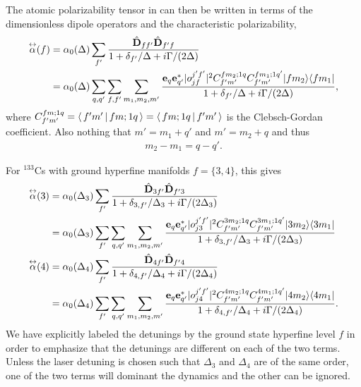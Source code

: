 The atomic polarizability tensor in  can then be written in terms of the dimensionless dipole operators and the characteristic polarizability,
\begin{align} \label{Eq::AtomicPolarizabilityF}
\tensor{\alpha}(f) &=  \alpha_0(\Delta) \sum_{f'} \frac{ \hat{\mathbf{D}}_{f f'} \hat{\mathbf{D}}_{f' f}}{ 1 + \delta_{f'} / \Delta + i \Gamma/(2\Delta)}\\
& = \alpha_0(\Delta) \sum_{q,q'}  \sum_{f,f'} \sum_{m_1, m_2, m'}  \frac{\mathbf{e}_q \mathbf{e}^*_{q'} | o^{j'f'}_{jf} |^2 C^{fm_2;1q}_{f'm'} C^{fm_1;1q'}_{f'm'} \op{f m_2}{f m_1}}{1 + \delta_{f'} / \Delta + i \Gamma/(2\Delta)},
\end{align}
where $ C^{fm;1q}_{f'm'}=  \langle\, f' m'\,\vert\, f m; 1 q \,\rangle= \langle\, f m; 1 q\,\vert\, f' m' \,\rangle$ is the Clebsch-Gordan coefficient. Also nothing that $m' = m_1 + q'$ and $m' = m_2 + q$ and thus
\begin{align}
	m_2 - m_1 = q-q'.
\end{align}

For ${}^{133}$Cs with ground hyperfine manifolds $f = \{3,4\}$, this gives
\begin{align}
\overset{\leftrightarrow}{\alpha}(3) 
		& = \alpha_0(\Delta_{3}) \sum_{f'} \frac{ \hat{\mathbf{D}}_{3 f'} \hat{\mathbf{D}}_{f' 3}}{ 1 + \delta_{3, f'} / \Delta_{3} + i \Gamma/(2\Delta_3) } \\
		&= \alpha_0(\Delta_{3}) \sum_{f'} \sum_{q,q'} \sum_{m_1, m_2, m'}\frac{ \mathbf{e}_q \mathbf{e}^*_{q'} | o^{j'f'}_{j3} |^2 C^{3m_2;1q}_{f'm'} C^{3m_1;1q'}_{f'm'} \lvert{3 m_2}\rangle\langle{3 m_1}\rvert}{ 1 + \delta_{3, f'} / \Delta_{3} + i \Gamma/(2\Delta_3) }\\
\overset{\leftrightarrow}{\alpha}(4) &=\alpha_0(\Delta_{4}) \sum_{f'} \frac{ \hat{\mathbf{D}}_{4 f'} \hat{\mathbf{D}}_{f' 4}}{ 1 + \delta_{4, f'} / \Delta_{4} + i \Gamma/(2\Delta_4) }\\
	 &= \alpha_0(\Delta_{4}) \sum_{f'} \sum_{q,q'} \sum_{m_1, m_2, m'}\frac{ \mathbf{e}_q \mathbf{e}^*_{q'} | o^{j'f'}_{j4} |^2 C^{4m_2;1q}_{f'm'} C^{4m_1;1q'}_{f'm'} \lvert{4 m_2}\rangle\langle{4 m_1}\rvert}{ 1 + \delta_{4, f'} / \Delta_{4} + i \Gamma/(2\Delta_4)} .
\end{align}
We have explicitly labeled the detunings by the ground state hyperfine level $f$ in order to emphasize that the detunings are different on each of the two terms.  Unless the laser detuning is chosen such that $\Delta_3$ and $\Delta_4$ are of the same order, one of the two terms will dominant the dynamics and the other can be ignored.


